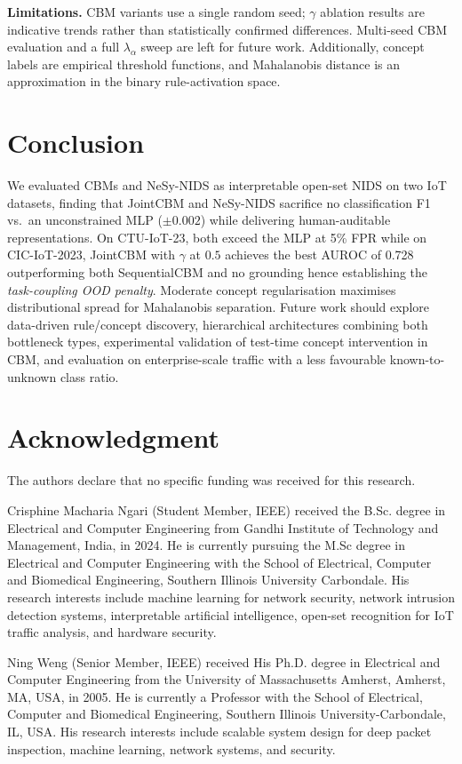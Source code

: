 \documentclass[journal]{IEEEtran}
\begin{document}
\textbf{Limitations.} CBM variants use a single random seed; $\gamma$
ablation results are indicative trends rather than statistically confirmed
differences. Multi-seed CBM evaluation and a full $\lambda_\alpha$ sweep are
left for future work. Additionally, concept labels are empirical threshold
functions, and Mahalanobis distance is an
approximation in the binary rule-activation space.

\section{Conclusion}

We evaluated CBMs and NeSy-NIDS as interpretable open-set NIDS on two IoT
datasets, finding that JointCBM and NeSy-NIDS sacrifice no classification F1
vs.\ an unconstrained MLP ($\pm0.002$) while delivering human-auditable representations.
On CTU-IoT-23, both exceed the MLP at 5\% FPR while on CIC-IoT-2023,
JointCBM with $\gamma$ at $0.5$ achieves the best AUROC of 0.728 outperforming
both SequentialCBM and no grounding hence establishing the \emph{task-coupling OOD penalty}. Moderate concept
regularisation maximises distributional spread for Mahalanobis separation.
Future work should explore data-driven rule/concept discovery, hierarchical
architectures combining both bottleneck types, experimental validation of test-time concept intervention in CBM, and evaluation on
enterprise-scale traffic with a less favourable known-to-unknown class ratio.

\section*{Acknowledgment}
The authors declare that no specific funding was received for this research.




\begin{IEEEbiographynophoto}{Crisphine Macharia Ngari}
(Student Member, IEEE) received the B.Sc. degree in Electrical and Computer
Engineering from Gandhi Institute of Technology and Management, India, in 2024. He is currently pursuing the M.Sc degree in Electrical and Computer Engineering with the School of Electrical, Computer and Biomedical Engineering, Southern Illinois University Carbondale. His research interests include machine learning for network security, network intrusion detection systems, interpretable artificial intelligence, open-set recognition for
IoT traffic analysis, and hardware security.
\end{IEEEbiographynophoto}

\begin{IEEEbiographynophoto}{Ning Weng}
(Senior Member, IEEE) received His Ph.D. degree in Electrical and Computer Engineering from
the University of Massachusetts Amherst, Amherst, MA, USA, in 2005.
He is currently a Professor with the School of Electrical, Computer
and Biomedical Engineering, Southern Illinois University-Carbondale, IL, USA.
His research interests include scalable system design for deep packet
inspection, machine learning, network systems, and security.
\end{IEEEbiographynophoto}
\end{document}
